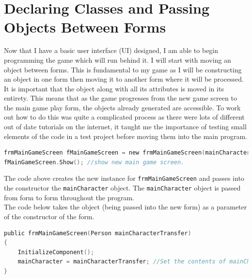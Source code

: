 \section{Declaring Classes and Passing Objects Between Forms}
Now that I have a basic user interface (UI) designed, I am able to begin programming the game which will run behind it. I will start with moving an object between forms. This is fundamental to my game as I will be constructing an object in one form then moving it to another form where it will be processed. It is important that the object along with all its attributes is moved in its entirety. This means that as the game progresses from the new game screen to the main game play form, the objects already generated are accessible. \newline
To work out how to do this was quite a complicated process as there were lots of different out of date tutorials on the internet, it taught me the importance of testing small elements of the code in a test project before moving them into the main program.
\begin{lstlisting}[language=c, style=csharp, caption=Displaying a new form and passing an object to it]
frmMainGameScreen fMainGameScreen = new frmMainGameScreen(mainCharacter); //create new frmMainGameScreen with parameter mainCharacter
fMainGameScreen.Show(); //show new main game screen.
\end{lstlisting}
\noindent The code above creates the new instance for \verb|frmMainGameScreen| and passes into the constructor the \verb|mainCharacter| object. The \verb|mainCharacter| object is passed from form to form throughout the program.\\
The code below takes the object (being passed into the new form) as a parameter of the constructor of the form.
\begin{lstlisting}[language=c, style=csharp, caption=New form constructor code containing processing for object being passed in as a parameter]
public frmMainGameScreen(Person mainCharacterTransfer)
{
    InitializeComponent();            
    mainCharacter = mainCharacterTransfer; //Set the contents of mainCharacter to mainCharacterTransfer which has come from previous form
}
\end{lstlisting}

